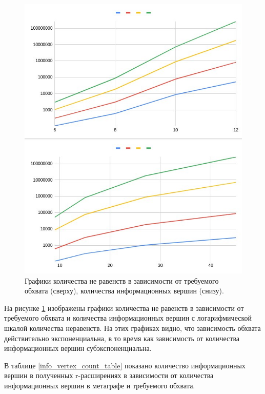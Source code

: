 \documentclass[14pt]{mmcs-article}
\begin{document}
\begin{figure}[H]
    \centering
    \includegraphics[scale=0.6]{eq_count_plots.jpg}
    \caption{ Графики количества не равенств в зависимости от требуемого обхвата (сверху), количества информационных вершин (снизу). }
    \label{eqs_count_plots}
\end{figure}

На рисунке \ref{eqs_count_plots} изображены графики количества не равенств в зависимости от требуемого обхвата и количества информационных вершин с логарифмической шкалой количества неравенств. На этих графиках видно, что зависимость обхвата действительно экспоненциальна, в то время как зависимость от количества информационных вершин субэкспоненциальна.

В таблице \ref{info_vertex_count_table} показано количество информационных вершин в полученных r-расширениях в зависимости от количества информационных вершин в метаграфе и требуемого обхвата.
\end{document}
